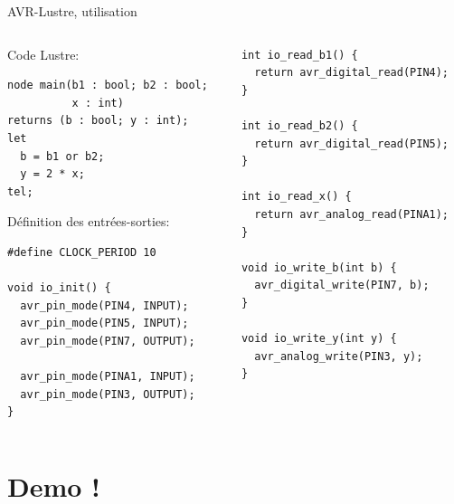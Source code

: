\documentclass[xcolor={svgnames}]{beamer}
\begin{document}
\begin{frame}[fragile]{AVR-Lustre, utilisation}
\lstset{basicstyle=\tt\scriptsize}
  \begin{columns}[T]
    \begin{column}{.5\textwidth}
      Code Lustre:
      \begin{lstlisting}
node main(b1 : bool; b2 : bool;
          x : int)
returns (b : bool; y : int);
let
  b = b1 or b2;
  y = 2 * x;
tel;
      \end{lstlisting}
      Définition des entrées-sorties:
      \lstset{language=[ANSI]C,basicstyle=\tt\scriptsize}

      \begin{lstlisting}
#define CLOCK_PERIOD 10

void io_init() {
  avr_pin_mode(PIN4, INPUT);
  avr_pin_mode(PIN5, INPUT);
  avr_pin_mode(PIN7, OUTPUT);

  avr_pin_mode(PINA1, INPUT);
  avr_pin_mode(PIN3, OUTPUT);
}
      \end{lstlisting}
    \end{column}
    \begin{column}{.5\textwidth}
      \lstset{language=[ANSI]C,basicstyle=\tt\scriptsize}
      \begin{lstlisting}
int io_read_b1() {
  return avr_digital_read(PIN4);
}

int io_read_b2() {
  return avr_digital_read(PIN5);
}

int io_read_x() {
  return avr_analog_read(PINA1);
}

void io_write_b(int b) {
  avr_digital_write(PIN7, b);
}

void io_write_y(int y) {
  avr_analog_write(PIN3, y);
}
      \end{lstlisting}
    \end{column}
  \end{columns}
\end{frame}

\section{Demo !}

\begin{frame}
  \printbibliography
\end{frame}
\end{document}

